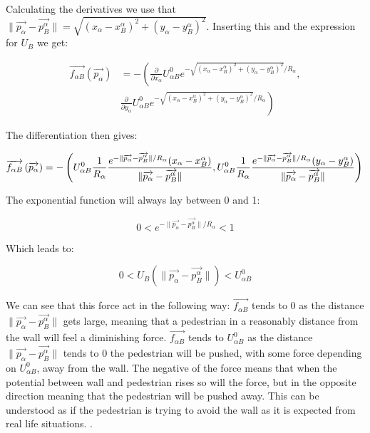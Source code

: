 Calculating the derivatives we use that
$\| \overrightarrow{p_{\alpha}} - \overrightarrow{p_{B}^{\alpha}} \|= \sqrt{(x_{\alpha}-x^{\alpha}_{B})^2+(y_{\alpha}-y^{\alpha}_B)^2}$.
Inserting this and the expression for $U_{B}$ we get:

\begin{equation}
\begin{split}
\overrightarrow{f_{\alpha B}} \left( \overrightarrow{p_{\alpha}} \right) 
& =-\left( \frac{\partial}{\partial x_{\alpha}}U^0_{\alpha B} e^{-\sqrt{(x_{\alpha}-x^{\alpha}_{B})^2+(y_{\alpha}-y^{\alpha}_B)^2}/R_{\alpha} }\right. , \\
& \left. \frac{\partial}{\partial y_{\alpha}}U^0_{\alpha B} e^{-\sqrt{(x_{\alpha}-x^{\alpha}_{B})^2+(y_{\alpha}-y^{\alpha}_B)^2}/R_{\alpha} } \right)
\end{split}
\end{equation}

The differentiation then gives: 

\begin{equation}\label{eqn:wall-repulsion}
    \overrightarrow{f_{\alpha B}} \left( \overrightarrow{p_{\alpha}} \right) 
=-\left(U^0_{\alpha B}\frac{1}{R_{\alpha}}\frac{e^{- \| \overrightarrow{p_{\alpha}} - \overrightarrow{p_{B}^{\alpha}} \| / R_{\alpha} } (x_{\alpha}-x_B^{\alpha})}{\| \overrightarrow{p_{\alpha}} - \overrightarrow{p_{B}^{\alpha}} \| },U^0_{\alpha B}\frac{1}{R_{\alpha}}\frac{e^{- \| \overrightarrow{p_{\alpha}} - \overrightarrow{p_{B}^{\alpha}} \| / R_{\alpha} } (y_{\alpha}-y_B^{\alpha})}{\| \overrightarrow{p_{\alpha}} - \overrightarrow{p_{B}^{\alpha}} \| }\right) \\
\end{equation}

The exponential function will always lay between 0 and  1:

\begin{equation}
0 < e^{ -\| \overrightarrow{p_{\alpha}} - \overrightarrow{p_{B}^{\alpha}} \| /R_\alpha} < 1
\end{equation}

Which leads to:

\begin{equation}
0< U_{B} \left( \| \overrightarrow{p_{\alpha}} - \overrightarrow{p_{B}^{\alpha}} \| \right) < U^0_{\alpha B}
\end{equation}

We can see that this force act in the following way: $\overrightarrow{f_{\alpha B}}$ tends to 0 as the distance 
$\| \overrightarrow{p_{\alpha}} - \overrightarrow{p_{B}^{\alpha}} \|$ gets large, meaning that a pedestrian in a reasonably 
distance from the wall will feel a diminishing force. $\overrightarrow{f_{\alpha B}}$ tends to $U^0_{\alpha B}$ 
as the distance $ \| \overrightarrow{p_{\alpha}} - \overrightarrow{p_{B}^{\alpha}} \|$ tends to $0$ the pedestrian will be 
pushed, with some force depending on $U^0_{\alpha B}$, away from the wall. The negative of the force 
means that when the potential between wall and pedestrian rises so will the force, but in the opposite 
direction meaning that the pedestrian will be pushed away. This can be understood as if the pedestrian 
is trying to avoid the wall as it is expected from real life situations. \cite{social-force}. %

